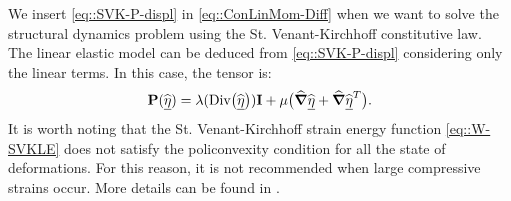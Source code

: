 We insert \eqref{eq::SVK-P-displ} in \eqref{eq::ConLinMom-Diff} when we
want to solve the structural
dynamics problem using the St. Venant-Kirchhoff constitutive law.\\ The
linear elastic model can be deduced from \eqref{eq::SVK-P-displ}
considering only the linear terms. In this case, the tensor \Piola is:
\begin{equation}
  \textbf{P}(\widehat{\underline{\eta}}) = \lambda(\text{Div}\big(\widehat{\underline{\eta}}\big))\textbf{I} +
  \mu\big(\widehat{\boldsymbol{\nabla}}\widehat{\underline{\eta}} + \widehat{\boldsymbol{\nabla}}\widehat{\underline{\eta}}^T\big).
  \label{eq::LE-P}
\end{equation}
It is worth noting that the St. Venant-Kirchhoff
strain energy function \eqref{eq::W-SVKLE} does not satisfy the
policonvexity condition for all the state of deformations. For this
reason, it is not recommended when large compressive strains
occur. More details can be found in \cite{Hozapfel}.

